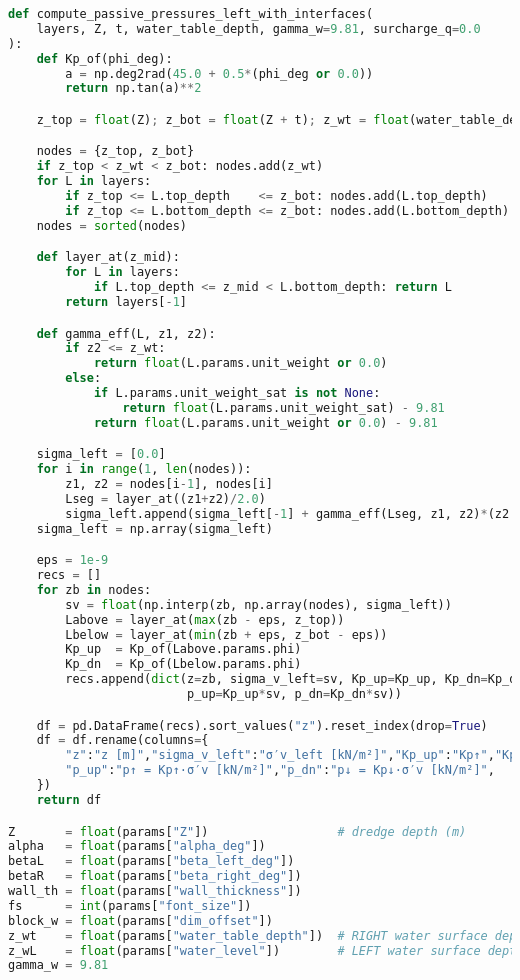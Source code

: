 \begin{lstlisting}[language=Python]
def compute_passive_pressures_left_with_interfaces(
    layers, Z, t, water_table_depth, gamma_w=9.81, surcharge_q=0.0
):
    def Kp_of(phi_deg):
        a = np.deg2rad(45.0 + 0.5*(phi_deg or 0.0))
        return np.tan(a)**2

    z_top = float(Z); z_bot = float(Z + t); z_wt = float(water_table_depth)

    nodes = {z_top, z_bot}
    if z_top < z_wt < z_bot: nodes.add(z_wt)
    for L in layers:
        if z_top <= L.top_depth    <= z_bot: nodes.add(L.top_depth)
        if z_top <= L.bottom_depth <= z_bot: nodes.add(L.bottom_depth)
    nodes = sorted(nodes)

    def layer_at(z_mid):
        for L in layers:
            if L.top_depth <= z_mid < L.bottom_depth: return L
        return layers[-1]

    def gamma_eff(L, z1, z2):
        if z2 <= z_wt:
            return float(L.params.unit_weight or 0.0)
        else:
            if L.params.unit_weight_sat is not None:
                return float(L.params.unit_weight_sat) - 9.81
            return float(L.params.unit_weight or 0.0) - 9.81

    sigma_left = [0.0]
    for i in range(1, len(nodes)):
        z1, z2 = nodes[i-1], nodes[i]
        Lseg = layer_at((z1+z2)/2.0)
        sigma_left.append(sigma_left[-1] + gamma_eff(Lseg, z1, z2)*(z2 - z1))
    sigma_left = np.array(sigma_left)

    eps = 1e-9
    recs = []
    for zb in nodes:
        sv = float(np.interp(zb, np.array(nodes), sigma_left))
        Labove = layer_at(max(zb - eps, z_top))
        Lbelow = layer_at(min(zb + eps, z_bot - eps))
        Kp_up  = Kp_of(Labove.params.phi)
        Kp_dn  = Kp_of(Lbelow.params.phi)
        recs.append(dict(z=zb, sigma_v_left=sv, Kp_up=Kp_up, Kp_dn=Kp_dn,
                         p_up=Kp_up*sv, p_dn=Kp_dn*sv))

    df = pd.DataFrame(recs).sort_values("z").reset_index(drop=True)
    df = df.rename(columns={
        "z":"z [m]","sigma_v_left":"σ′v_left [kN/m²]","Kp_up":"Kp↑","Kp_dn":"Kp↓",
        "p_up":"p↑ = Kp↑·σ′v [kN/m²]","p_dn":"p↓ = Kp↓·σ′v [kN/m²]",
    })
    return df

Z       = float(params["Z"])                  # dredge depth (m)
alpha   = float(params["alpha_deg"])
betaL   = float(params["beta_left_deg"])
betaR   = float(params["beta_right_deg"])
wall_th = float(params["wall_thickness"])
fs      = int(params["font_size"])
block_w = float(params["dim_offset"])
z_wt    = float(params["water_table_depth"])  # RIGHT water surface depth (for total water)
z_wL    = float(params["water_level"])        # LEFT water surface depth (for total water)
gamma_w = 9.81


\end{lstlisting}
